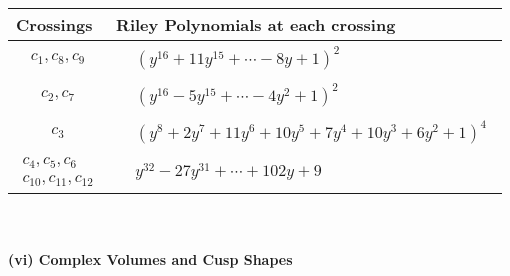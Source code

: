 \documentclass[1p]{elsarticle_modified}
\theoremstyle{definition}
\begin{document}
\begin{tabular}{m{50pt}|m{274pt}}
Crossings & \hspace{64pt}Riley Polynomials at each crossing \\
\hline $$\begin{aligned}c_{1},c_{8},c_{9}\end{aligned}$$&$\begin{aligned}
&(y^{16}+11 y^{15}+\cdots-8 y+1)^{2}
\end{aligned}$\\
\hline $$\begin{aligned}c_{2},c_{7}\end{aligned}$$&$\begin{aligned}
&(y^{16}-5 y^{15}+\cdots-4 y^2+1)^{2}
\end{aligned}$\\
\hline $$\begin{aligned}c_{3}\end{aligned}$$&$\begin{aligned}
&(y^8+2 y^7+11 y^6+10 y^5+7 y^4+10 y^3+6 y^2+1)^4
\end{aligned}$\\
\hline $$\begin{aligned}c_{4},c_{5},c_{6}\\c_{10},c_{11},c_{12}\end{aligned}$$&$\begin{aligned}
&y^{32}-27 y^{31}+\cdots+102 y+9
\end{aligned}$\\
\hline
\end{tabular}\\~\\
\newpage\flushleft \textbf{(vi) Complex Volumes and Cusp Shapes}
\end{document}
